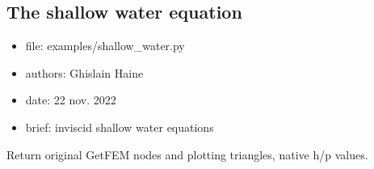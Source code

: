 \documentclass[letterpaper,10pt,english]{sphinxmanual}
\begin{document}
\subsection{The shallow water equation}
\label{\detokenize{examples/shallow_water:the-shallow-water-equation}}\label{\detokenize{examples/shallow_water::doc}}\label{\detokenize{examples/shallow_water:shallow-water-2d}}\label{\detokenize{examples/shallow_water:module-examples.shallow_water}}\begin{itemize}
\item {} 
\sphinxAtStartPar
file:             examples/shallow\_water.py

\item {} 
\sphinxAtStartPar
authors:          Ghislain Haine

\item {} 
\sphinxAtStartPar
date:             22 nov. 2022

\item {} 
\sphinxAtStartPar
brief:            inviscid shallow water equations

\end{itemize}

\begin{fulllineitems}
\label{\detokenize{examples/shallow_water:examples.shallow_water.native_triangular_field}}
\pysigstartsignatures
\pysiglinewithargsret
{}
{\sphinxparamcomma {}}
{}
\pysigstopsignatures
\sphinxAtStartPar
Return original GetFEM nodes and plotting triangles, native h/p values.

\end{fulllineitems}

\end{document}
